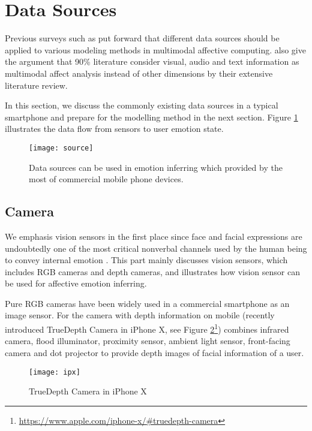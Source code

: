 \section{Data Sources}\label{sec:source}

Previous surveys such as  \cite{Tao2005, Zhang2014, Poria2017, Garcia2017} put forward that different data sources should be applied to various modeling methods in multimodal affective computing. \cite{Poria2017} also give the argument that 90\% literature consider visual, audio and text information as multimodal affect analysis instead of other dimensions by their extensive literature review.

In this section, we discuss the commonly existing data sources in a typical smartphone and prepare for the modelling method in the next section. Figure \ref{fig:source} illustrates the data flow from sensors to user emotion state.

\begin{figure}
    \centering
    \texttt{[image: source]}
    \caption{Data sources can be used in emotion inferring which provided by the most of commercial mobile phone devices.}
    \label{fig:source}
\end{figure}

\subsection{Camera}\label{subsec:vision}
We emphasis vision sensors in the first place since face and facial expressions are undoubtedly one of the most critical nonverbal channels used by the human being to convey internal emotion \cite{james2013emotion, Poria2017}. This part mainly discusses vision sensors, which includes RGB cameras and depth cameras, and illustrates how vision sensor can be used for affective emotion inferring.

Pure RGB cameras have been widely used in a commercial smartphone as an image sensor. 
For the camera with depth information on mobile (recently introduced TrueDepth Camera in iPhone X, see Figure \ref{fig:ipx}\footnote{\url{https://www.apple.com/iphone-x/\#truedepth-camera}}) combines infrared camera, flood illuminator, proximity sensor, ambient light sensor, front-facing camera and dot projector to provide depth images of facial information of a user.

\begin{figure}
    \centering
    \label{fig:ipx}
    \texttt{[image: ipx]}
    \caption{TrueDepth Camera in iPhone X }
\end{figure}


